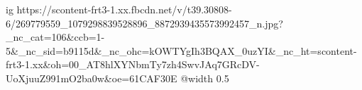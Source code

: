  
 
 
 
 

\ifcmt
  ig https://scontent-frt3-1.xx.fbcdn.net/v/t39.30808-6/269779559_1079298839528896_8872939435573992457_n.jpg?_nc_cat=106&ccb=1-5&_nc_sid=b9115d&_nc_ohc=kOWTYgIh3BQAX_0uzYI&_nc_ht=scontent-frt3-1.xx&oh=00_AT8hlXYNbmTy7zh4SwvJAq7GRcDV-UoXjuuZ991mO2ba0w&oe=61CAF30E
  @width 0.5
\fi
